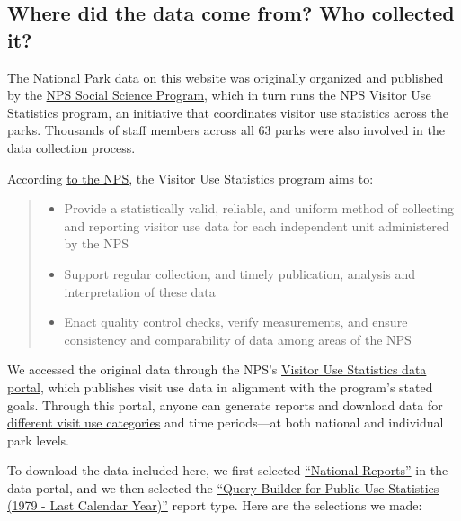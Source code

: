 \documentclass[
  letterpaper,
  DIV=11,
  numbers=noendperiod]{scrartcl}
\providecommand{\tightlist}{%
  \setlength{\itemsep}{0pt}\setlength{\parskip}{0pt}}\usepackage{longtable,booktabs,array}
\begin{document}
\subsection{Where did the data come from? Who collected
it?}\label{where-did-the-data-come-from-who-collected-it}

The National Park data on this website was originally organized and
published by the
\href{https://www.nps.gov/subjects/socialscience/visitor-use-statistics.htm}{NPS
Social Science Program}, which in turn runs the NPS Visitor Use
Statistics program, an initiative that coordinates visitor use
statistics across the parks. Thousands of staff members across all 63
parks were also involved in the data collection process.

According
\href{https://www.nps.gov/subjects/socialscience/statistics-history.htm}{to
the NPS}, the Visitor Use Statistics program aims to:

\begin{quote}
\begin{itemize}
\tightlist
\item
  Provide a statistically valid, reliable, and uniform method of
  collecting and reporting visitor use data for each independent unit
  administered by the NPS
\item
  Support regular collection, and timely publication, analysis and
  interpretation of these data
\item
  Enact quality control checks, verify measurements, and ensure
  consistency and comparability of data among areas of the NPS
\end{itemize}
\end{quote}

We accessed the original data through the NPS's
\href{https://irma.nps.gov/Stats/}{Visitor Use Statistics data portal},
which publishes visit use data in alignment with the program's stated
goals. Through this portal, anyone can generate reports and download
data for \href{https://irma.nps.gov/Stats/Reports/National}{different
visit use categories} and time periods---at both national and individual
park levels.

To download the data included here, we first selected
\href{https://irma.nps.gov/Stats/Reports/National}{``National Reports''}
in the data portal, and we then selected the
\href{https://irma.nps.gov/Stats/SSRSReports/National\%20Reports/Query\%20Builder\%20for\%20Public\%20Use\%20Statistics\%20(1979\%20-\%20Last\%20Calendar\%20Year)}{``Query
Builder for Public Use Statistics (1979 - Last Calendar Year)''} report
type. Here are the selections we made:
\end{document}
